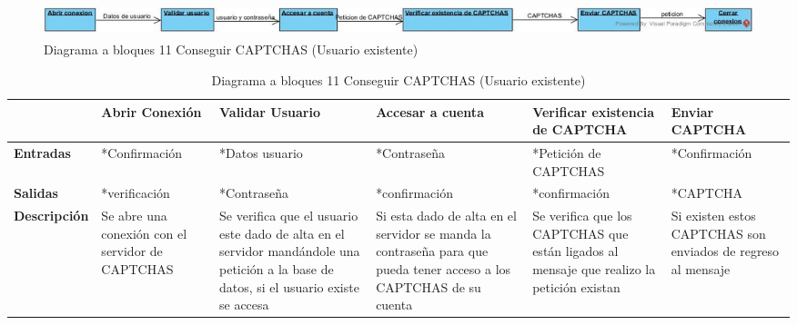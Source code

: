 \documentclass[12pt,oneside,onecolumn,openany]{report}
\begin{document}
\begin{figure}[H]
	\includegraphics[width=1\linewidth, height=1cm]{./images/bloques11.jpg}
	\caption{Diagrama a bloques 11 Conseguir CAPTCHAS (Usuario existente)}
	\label{fig:5-11-1}
\end{figure}
\begin{table}[H]
 \centering
   {
     \begin{tabular}{| p{} | p{3cm} | p{2cm} | p{2cm} | p{3cm} | p{3cm} |}
     \hline
     & \textbf{Abrir Conexión} & \textbf{Validar Usuario} & \textbf{Accesar a cuenta} & \textbf{Verificar existencia de CAPTCHA} & \textbf{Enviar CAPTCHA}\\
     \hline
     \textbf{Entradas} & *Confirmación & *Datos usuario & *Contraseña & *Petición de CAPTCHAS & *Confirmación\\
     \hline
     \textbf{Salidas} & *verificación & *Contraseña & *confirmación & *confirmación & *CAPTCHA\\
     \hline
     \textbf{Descripción} & Se abre una conexión con el servidor de CAPTCHAS & Se verifica que el usuario este dado de alta en el servidor mandándole una petición a la base de datos, si el usuario existe se accesa & Si esta dado de alta en el servidor se manda la contraseña para que pueda tener acceso a los CAPTCHAS de su cuenta & Se verifica que los CAPTCHAS que están ligados al mensaje que realizo la petición existan & Si existen estos CAPTCHAS son enviados de regreso al mensaje\\

    \end{tabular}
    }
    \caption{Diagrama a bloques 11 Conseguir CAPTCHAS (Usuario existente)}
    \label{tabla:b11}
\end{table}
\end{document}
